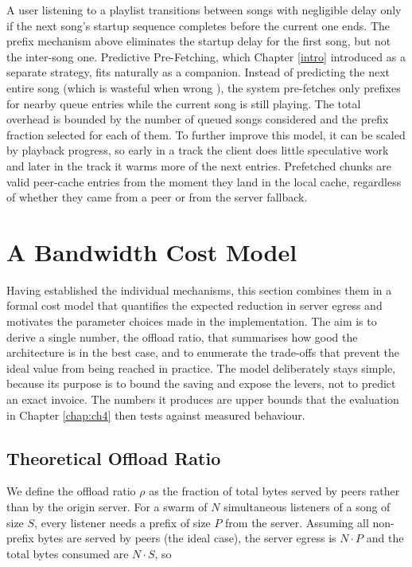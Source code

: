 \indent \par A user listening to a playlist transitions between songs with negligible delay only if the next song's startup sequence completes before the current one ends. The prefix mechanism above eliminates the startup delay for the first song, but not the inter-song one. Predictive Pre-Fetching, which Chapter \ref{intro} introduced as a separate strategy, fits naturally as a companion. Instead of predicting the next entire song (which is wasteful when wrong \cite{bandwidth_aware_prefetching}), the system pre-fetches only prefixes for nearby queue entries while the current song is still playing. The total overhead is bounded by the number of queued songs considered and the prefix fraction selected for each of them. To further improve this model, it can be scaled by playback progress, so early in a track the client does little speculative work and later in the track it warms more of the next entries. Prefetched chunks are valid peer-cache entries from the moment they land in the local cache, regardless of whether they came from a peer or from the server fallback.


\section{A Bandwidth Cost Model}
\label{sec:cost-model}

\indent \par Having established the individual mechanisms, this section combines them in a formal cost model that quantifies the expected reduction in server egress and motivates the parameter choices made in the implementation. The aim is to derive a single number, the offload ratio, that summarises how good the architecture is in the best case, and to enumerate the trade-offs that prevent the ideal value from being reached in practice. The model deliberately stays simple, because its purpose is to bound the saving and expose the levers, not to predict an exact invoice. The numbers it produces are upper bounds that the evaluation in Chapter \ref{chap:ch4} then tests against measured behaviour.

\subsection{Theoretical Offload Ratio}
\label{subsec:offload-ratio}

\indent \par We define the offload ratio $\rho$ as the fraction of total bytes served by peers rather than by the origin server. For a swarm of $N$ simultaneous listeners of a song of size $S$, every listener needs a prefix of size $P$ from the server. Assuming all non-prefix bytes are served by peers (the ideal case), the server egress is $N \cdot P$ and the total bytes consumed are $N \cdot S$, so

